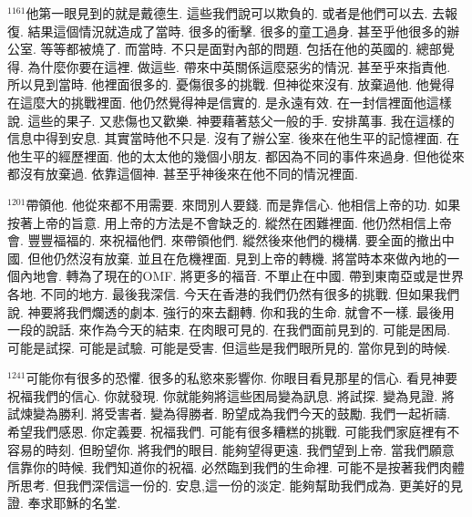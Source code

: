 \documentclass{book}
\begin{document}
$^{1161}$他第一眼見到的就是戴德生.
這些我們說可以欺負的.
或者是他們可以去.
去報復.
結果這個情況就造成了當時.
很多的衝擊.
很多的童工過身.
甚至乎他很多的辦公室.
等等都被燒了.
而當時.
不只是面對內部的問題.
包括在他的英國的.
總部覺得.
為什麼你要在這裡.
做這些.
帶來中英關係這麼惡劣的情況.
甚至乎來指責他.
所以見到當時.
他裡面很多的.
憂傷很多的挑戰.
但神從來沒有.
放棄過他.
他覺得在這麼大的挑戰裡面.
他仍然覺得神是信實的.
是永遠有效.
在一封信裡面他這樣說.
這些的果子.
又悲傷也又歡樂.
神要藉著慈父一般的手.
安排萬事.
我在這樣的信息中得到安息.
其實當時他不只是.
沒有了辦公室.
後來在他生平的記憶裡面.
在他生平的經歷裡面.
他的太太他的幾個小朋友.
都因為不同的事件來過身.
但他從來都沒有放棄過.
依靠這個神.
甚至乎神後來在他不同的情況裡面.

$^{1201}$帶領他.
他從來都不用需要.
來問別人要錢.
而是靠信心.
他相信上帝的功.
如果按著上帝的旨意.
用上帝的方法是不會缺乏的.
縱然在困難裡面.
他仍然相信上帝會.
豐豐福福的.
來祝福他們.
來帶領他們.
縱然後來他們的機構.
要全面的撤出中國.
但他仍然沒有放棄.
並且在危機裡面.
見到上帝的轉機.
將當時本來做內地的一個內地會.
轉為了現在的OMF.
將更多的福音.
不單止在中國.
帶到東南亞或是世界各地.
不同的地方.
最後我深信.
今天在香港的我們仍然有很多的挑戰.
但如果我們說.
神要將我們爛透的劇本.
強行的來去翻轉.
你和我的生命.
就會不一樣.
最後用一段的說話.
來作為今天的結束.
在肉眼可見的.
在我們面前見到的.
可能是困局.
可能是試探.
可能是試驗.
可能是受害.
但這些是我們眼所見的.
當你見到的時候.

$^{1241}$可能你有很多的恐懼.
很多的私慾來影響你.
你眼目看見那星的信心.
看見神要祝福我們的信心.
你就發現.
你就能夠將這些困局變為訊息.
將試探.
變為見證.
將試煉變為勝利.
將受害者.
變為得勝者.
盼望成為我們今天的鼓勵.
我們一起祈禱.
希望我們感恩.
你定義要.
祝福我們.
可能有很多糟糕的挑戰.
可能我們家庭裡有不容易的時刻.
但盼望你.
將我們的眼目.
能夠望得更遠.
我們望到上帝.
當我們願意信靠你的時候.
我們知道你的祝福.
必然臨到我們的生命裡.
可能不是按著我們肉體所思考.
但我們深信這一份的.
安息,這一份的淡定.
能夠幫助我們成為.
更美好的見證.
奉求耶穌的名堂.
\newpage
\end{document}
